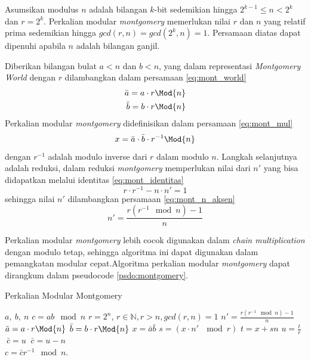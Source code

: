 Asumsikan modulus $ n $ adalah bilangan $k$-bit sedemikian hingga $ 2^{k-1} \leq n < 2^{k} $ dan $ r = 2^{k}$. Perkalian modular \textit{montgomery} memerlukan nilai $ r $ dan $ n $ yang relatif prima sedemikian hingga $ gcd(r, n) = gcd(2^k, n) = 1 $. Persamaan diatas dapat dipenuhi apabila $ n $ adalah bilangan ganjil.

Diberikan bilangan bulat $ a < n $ dan $ b < n $, yang dalam representasi \textit{Montgomery World} dengan $ r $ dilambangkan dalam persamaan \eqref{eq:mont_world}
\begin{equation}
	\begin{aligned}
		\bar{a} = a \cdot r \Mod{n} \\
		\bar{b} = b \cdot r \Mod{n} \\
	\end{aligned}
	\label{eq:mont_world}
\end{equation}
Perkalian modular \textit{montgomery} didefinisikan dalam persamaan \eqref{eq:mont_mul}
\begin{equation}
	x = \bar{a} \cdot \bar{b} \cdot r^{-1} \Mod{n}
	\label{eq:mont_mul}
\end{equation}
dengan $ r^{-1} $ adalah modulo inverse dari $ r $ dalam modulo $ n $. Langkah selanjutnya adalah reduksi, dalam reduksi \textit{montgomery} memperlukan nilai dari $ n' $ yang bisa didapatkan melalui identitas \eqref{eq:mont_identitas}
\begin{equation}
	r \cdot r^{-1} - n \cdot n' = 1
	\label{eq:mont_identitas}
\end{equation}
sehingga nilai $ n' $ dilambangkan persamaan \eqref{eq:mont_n_aksen}
\begin{equation}
	n' = \frac{r(r^{-1}\mod{n}) -1}{n}
	\label{eq:mont_n_aksen}
\end{equation}

Perkalian modular \textit{montgomery} lebih cocok digunakan dalam \textit{chain multiplication} dengan modulo tetap, sehingga algoritma ini dapat digunakan dalam pemangkatan modular cepat.Algoritma perkalian modular \textit{montgomery} dapat dirangkum dalam pseudocode \ref{psdo:montgomery}. 

\begin{algorithm}
	\caption{Perkalian Modular Montgomery}
	\label{psdo:montgomery}
	\begin{algorithmic}[1]
		\Require $a,\ b,\ n$
		\Ensure $c = ab\mod{n}$
		\State $r = 2^n $, $ r \in \mathbb{N}, r > n, gcd(r,n) = 1 $
		\State $n' = \frac{r(r^{-1}\mod{n}) -1}{n} $
		\State $\bar{a} = a \cdot r \Mod{n} $
		\State $\bar{b} = b \cdot r \Mod{n} $
		\State $x = \bar{a}\bar{b} $
		\State $s = (x \cdot n'\ \mod{r}) $
		\State $t = x + sn $
		\State $u = \frac{t}{r} $
			$\ \bar{c} = u $
		\Else
			$\ \bar{c} = u - n $
		\EndIf \\
		\Return $ c = \bar{c}r^{-1}\mod{n} $.
	\end{algorithmic}
\end{algorithm}

